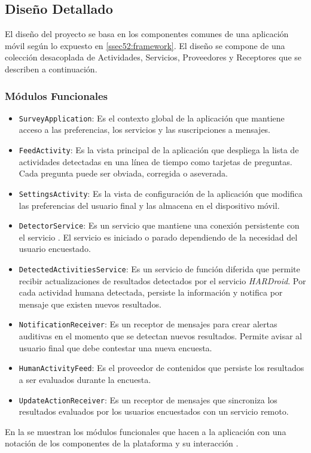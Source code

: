 \subsection{Diseño Detallado}

El diseño del proyecto se basa en los componentes comunes de una aplicación
móvil \emph{ }según lo expuesto en \ref{ssec52:framework}.
El diseño se compone de una colección desacoplada de Actividades,
Servicios, Proveedores y Receptores que se describen a continuación.

\subsubsection{Módulos Funcionales}
\begin{itemize}
\item \texttt{\small{}SurveyApplication}: Es el contexto global de la aplicación
que mantiene acceso a las preferencias, los servicios y las suscripciones
a mensajes.
\item \texttt{\small{}FeedActivity}: Es la vista principal de la aplicación
que despliega la lista de actividades detectadas en una línea de tiempo
como tarjetas de preguntas. Cada pregunta puede ser obviada, corregida
o aseverada. 
\item \texttt{\small{}SettingsActivity}: Es la vista de configuración de
la aplicación que modifica las preferencias del usuario final y las
almacena en el dispositivo móvil.
\item \texttt{\small{}DetectorService}: Es un servicio que mantiene una
conexión persistente con el servicio \emph{}. El servicio
es iniciado o parado dependiendo de la necesidad del usuario encuestado.
\item \texttt{\small{}DetectedActivitiesService}: Es un servicio de función
diferida que permite recibir actualizaciones de resultados detectados
por el servicio \emph{HARDroid}. Por cada actividad humana detectada,
persiste la información y notifica por mensaje que existen nuevos
resultados.
\item \texttt{\small{}NotificationReceiver}: Es un receptor de mensajes
para crear alertas auditivas en el momento que se detectan nuevos
resultados. Permite avisar al usuario final que debe contestar una
nueva encuesta.
\item \texttt{\small{}HumanActivityFeed}: Es el proveedor de contenidos
que persiste los resultados a ser evaluados durante la encuesta.
\item \texttt{\small{}UpdateActionReceiver}: Es un receptor de mensajes
que sincroniza los resultados evaluados por los usuarios encuestados
con un servicio remoto.
\end{itemize}
En la  se muestran los módulos funcionales
que hacen a la aplicación con una notación de los componentes de la
plataforma \emph{ }y su interacción \cite{Gargenta2014}. 

